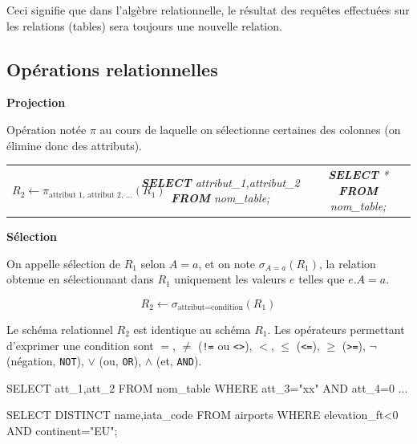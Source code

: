 \documentclass[10pt,fleqn]{article} %
\begin{document}
Ceci signifie que dans l'algèbre relationnelle, le résultat des requêtes effectuées sur les relations (tables) sera toujours une nouvelle relation. 



\subsection*{Opérations relationnelles}

\begin{defi}
\textbf{Projection}

Opération notée $\pi$ au cours de laquelle on sélectionne certaines des colonnes (on élimine donc des attributs). 
\begin{tabular}{ccc}
$
 R_2 \leftarrow \pi_{\text{attribut 1, attribut 2, ...}}(R_1)
$
& 
\textsl{\textbf{SELECT} attribut\_1,attribut\_2 \textbf{FROM} nom\_table;}
&
\textsl{\textbf{SELECT} * \textbf{FROM} nom\_table;}
\end{tabular}
\end{defi}




\begin{defi}
\textbf{Sélection}

On appelle sélection de $R_1$ selon $A=a$, et on note $\sigma_{A=a}(R_1)$, la relation obtenue en sélectionnant dans $R_1$ uniquement les valeurs $e$ telles que $e.A = a$.


$$
R_2 \leftarrow \sigma_{\text{attribut}=\text{condition}}(R_1)
$$


Le schéma relationnel $R_2$ est identique au schéma $R_1$.  Les opérateurs permettant d'exprimer une condition sont $=$, $\neq$ (\texttt{!=} ou \texttt{<>}), $<$, $\leq$ (\texttt{<=}), $\geq$ (\texttt{>=}), $\neg$ (négation, \texttt{NOT}), $\vee$ (ou, \texttt{OR}), $\wedge$ (et, \texttt{AND}).


\end{defi}

\begin{envsql}
\begin{sql}
SELECT att_1,att_2 FROM nom_table WHERE att_3="xx" AND att_4=0 ...
\end{sql}
\end{envsql}


\begin{envsql}
\begin{sql}
SELECT DISTINCT name,iata_code FROM airports WHERE elevation_ft<0 AND continent="EU";
\end{sql}
\end{envsql}
\end{document}
